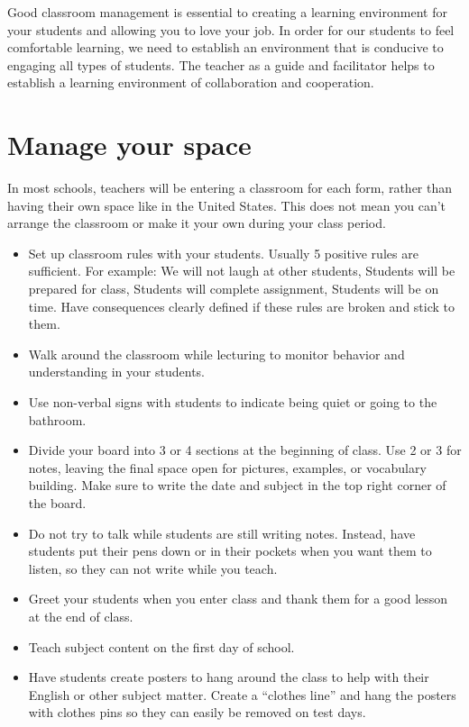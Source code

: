 Good classroom management is essential to creating a learning environment for your students and allowing you to love your job.  In order for our students to feel comfortable learning, we need to establish an environment that is conducive to engaging all types of students.  The teacher as a guide and facilitator helps to establish a learning environment of collaboration and cooperation.

\section{Manage your space}
In most schools, teachers will be entering a classroom for each form, rather than having their own space like in the United States.  This does not mean you can't arrange the classroom or make it your own during your class period.   

\begin{itemize}
 \item Set up classroom rules with your students. Usually 5 positive rules are sufficient. For example: We will not laugh at other students, Students will be prepared for class, Students will complete assignment, Students will be on time.  Have consequences clearly defined if these rules are broken and stick to them.  
 \item Walk around the classroom while lecturing to monitor behavior and understanding in your students.  
 \item Use non-verbal signs with students to indicate being quiet or going to the bathroom.
 \item Divide your board into 3 or 4 sections at the beginning of class.  Use 2 or 3 for notes, leaving the final space open for pictures, examples, or vocabulary building. Make sure to write the date and subject in the top right corner of the board.
 \item Do not try to talk while students are still writing notes. Instead, have students put their pens down or in their pockets when you want them to listen, so they can not write while you teach.
 \item Greet your students when you enter class and thank them for a good lesson at the end of class.
 \item Teach subject content on the first day of school.
 \item Have students create posters to hang around the class to help with their English or other subject matter.  Create a ``clothes line'' and hang the posters with clothes pins so they can easily be removed on test days.
\end{itemize}

